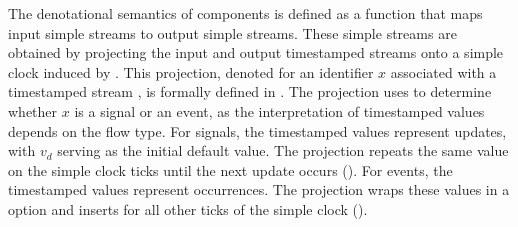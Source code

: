 The denotational semantics of \GRSync components is defined as a function that maps input simple
streams to output simple streams. These simple streams are obtained by projecting the input and
output timestamped streams onto a simple clock induced by \tck. This projection, denoted
 for an identifier $x$ associated with a timestamped stream \ts,
is formally defined in
.
The projection uses \tyCtx to determine whether $x$ is a signal or an event, as the interpretation
of timestamped values depends on the flow type. For signals, the timestamped values represent
updates, with $v_d$ serving as the initial default value. The projection repeats the same value on
the simple clock ticks until the next update occurs
().
For events, the timestamped values represent occurrences. The projection wraps these values in a
 option and inserts \none for all other ticks of the simple clock
().

\begin{center}
\end{center}

